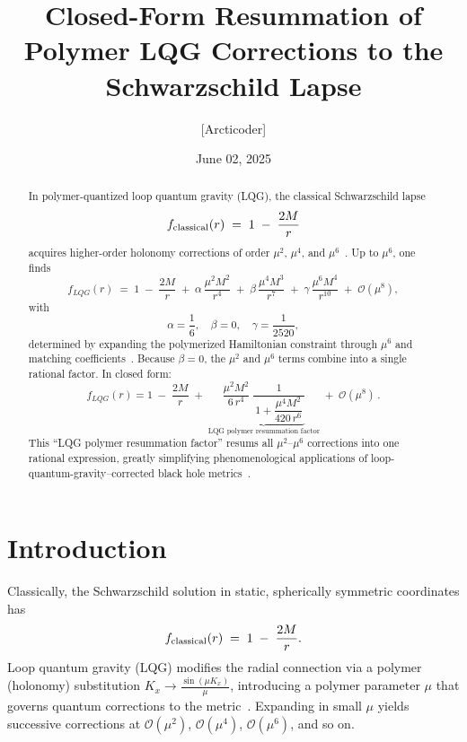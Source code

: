 \documentclass[11pt]{article}
\begin{document}
\title{Closed-Form Resummation of Polymer LQG Corrections to the Schwarzschild Lapse}
\author{[Arcticoder]}
\date{June 02, 2025}
\maketitle

\begin{abstract}
In polymer-quantized loop quantum gravity (LQG), the classical Schwarzschild lapse
\[
f_{\rm classical}(r) \;=\; 1 \;-\;\frac{2M}{r}
\]
acquires higher-order holonomy corrections of order $\mu^2$, $\mu^4$, and $\mu^6$~\cite{Bojowald2008,Modesto2006}.  Up to $\mu^6$, one finds
\[
f_{LQG}(r) \;=\; 
1 \;-\; \frac{2M}{r}
\;+\; \alpha\,\frac{\mu^{2}M^{2}}{r^{4}}
\;+\; \beta\,\frac{\mu^{4}M^{3}}{r^{7}}
\;+\; \gamma\,\frac{\mu^{6}M^{4}}{r^{10}}
\;+\;\mathcal{O}(\mu^{8}),
\]
with
\[
\alpha = \frac{1}{6},\quad \beta = 0,\quad \gamma = \frac{1}{2520},
\]
determined by expanding the polymerized Hamiltonian constraint through $\mu^6$ and matching coefficients~\cite{remumsion2025}.  Because $\beta=0$, the $\mu^2$ and $\mu^6$ terms combine into a single rational factor.  In closed form:
\begin{equation}\label{eq:resummed}
f_{LQG}(r)
= 1 \;-\; \frac{2M}{r}
\;+\; \underbrace{\frac{\mu^{2}M^{2}}{6\,r^{4}}\;
  \frac{1}{\,1 + \dfrac{\mu^{4}M^{2}}{420\,r^{6}}\,}}_{\text{LQG polymer resummation factor}}
\;+\;\mathcal{O}(\mu^{8})\,.
\end{equation}
This “LQG polymer resummation factor” resums all $\mu^2$–$\mu^6$ corrections into one rational expression, greatly simplifying phenomenological applications of loop-quantum-gravity–corrected black hole metrics~\cite{remumsion2025}.  
\end{abstract}

\section{Introduction}

Classically, the Schwarzschild solution in static, spherically symmetric coordinates has
\[
f_{\rm classical}(r) \;=\; 1 \;-\; \frac{2M}{r}.
\]
Loop quantum gravity (LQG) modifies the radial connection via a polymer (holonomy) substitution \(K_x \to \frac{\sin(\mu K_x)}{\mu}\), introducing a polymer parameter $\mu$ that governs quantum corrections to the metric~\cite{AshtekarLewandowski2004,Bojowald2008}.  Expanding in small $\mu$ yields successive corrections at $\mathcal{O}(\mu^2)$, $\mathcal{O}(\mu^4)$, $\mathcal{O}(\mu^6)$, and so on.
\end{document}
